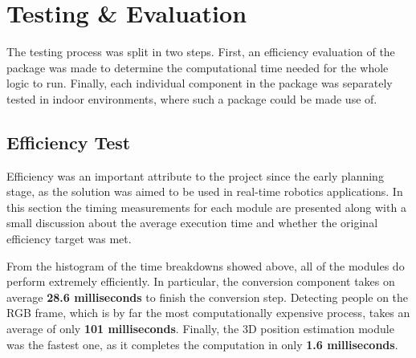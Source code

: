 \chapter{Testing \& Evaluation}
\label{chapter6}

The testing process was split in two steps. First, an efficiency evaluation of the package was made to determine the computational time needed for the whole logic to run. Finally, each individual component in the package was separately tested in indoor environments, where such a package could be made use of.

\section{Efficiency Test}

Efficiency was an important attribute to the project since the early planning stage, as the solution was aimed to be used in real-time robotics applications. In this section the timing measurements for each module are presented along with a small discussion about the average execution time and whether the original efficiency target was met.


From the histogram of the time breakdowns showed above, all of the modules do perform extremely efficiently. In particular, the conversion component takes on average \textbf{28.6 milliseconds} to finish the conversion step. Detecting people on the RGB frame, which is by far the most computationally expensive process, takes an average of only \textbf{101 milliseconds}. Finally, the 3D position estimation module was the fastest one, as it completes the computation in only \textbf{1.6 milliseconds}.

